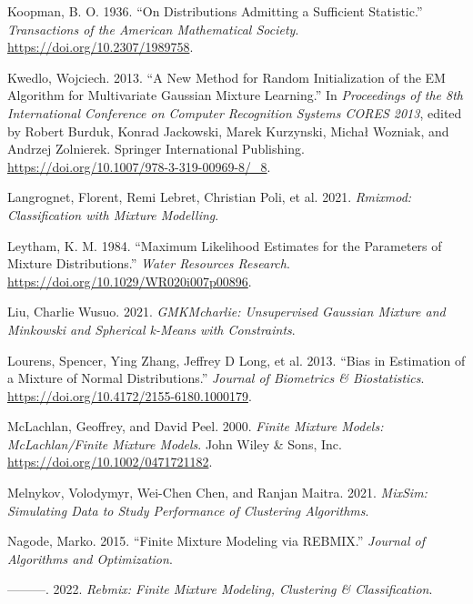 \begin{CSLReferences}{1}{0}
\leavevmode{}%
Koopman, B. O. 1936. {``On {Distributions Admitting} a {Sufficient Statistic}.''} \emph{Transactions of the American Mathematical Society}. \url{https://doi.org/10.2307/1989758}.

\leavevmode{}%
Kwedlo, Wojciech. 2013. {``A {New Method} for {Random Initialization} of the {EM Algorithm} for {Multivariate Gaussian Mixture Learning}.''} In \emph{Proceedings of the {8th International Conference} on {Computer Recognition Systems CORES 2013}}, edited by Robert Burduk, Konrad Jackowski, Marek Kurzynski, Michał Wozniak, and Andrzej Zolnierek. Springer International Publishing. \url{https://doi.org/10.1007/978-3-319-00969-8/_8}.

\leavevmode{}%
Langrognet, Florent, Remi Lebret, Christian Poli, et al. 2021. \emph{Rmixmod: Classification with Mixture Modelling}.

\leavevmode{}%
Leytham, K. M. 1984. {``Maximum {Likelihood Estimates} for the {Parameters} of {Mixture Distributions}.''} \emph{Water Resources Research}. \url{https://doi.org/10.1029/WR020i007p00896}.

\leavevmode{}%
Liu, Charlie Wusuo. 2021. \emph{GMKMcharlie: Unsupervised Gaussian Mixture and Minkowski and Spherical k-Means with Constraints}.

\leavevmode{}%
Lourens, Spencer, Ying Zhang, Jeffrey D Long, et al. 2013. {``Bias in {Estimation} of a {Mixture} of {Normal Distributions}.''} \emph{Journal of Biometrics \& Biostatistics}. \url{https://doi.org/10.4172/2155-6180.1000179}.

\leavevmode{}%
McLachlan, Geoffrey, and David Peel. 2000. \emph{Finite {Mixture Models}: {McLachlan}/{Finite Mixture Models}}. John Wiley \& Sons, Inc. \url{https://doi.org/10.1002/0471721182}.

\leavevmode{}%
Melnykov, Volodymyr, Wei-Chen Chen, and Ranjan Maitra. 2021. \emph{MixSim: Simulating Data to Study Performance of Clustering Algorithms}.

\leavevmode{}%
Nagode, Marko. 2015. {``Finite Mixture Modeling via REBMIX.''} \emph{Journal of Algorithms and Optimization}.

\leavevmode{}%
---------. 2022. \emph{Rebmix: Finite Mixture Modeling, Clustering \& Classification}.


\end{CSLReferences}
